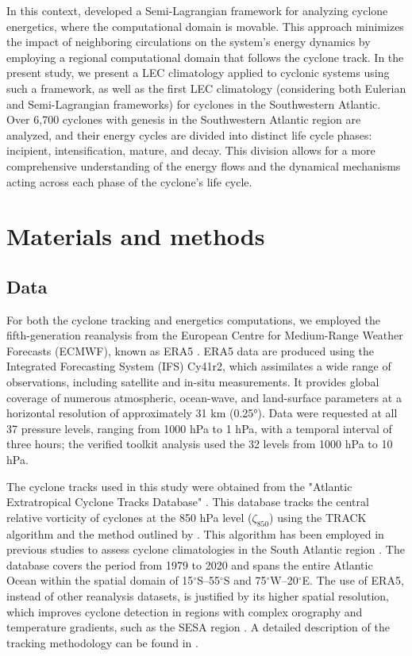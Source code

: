 \documentclass[pdflatex,sn-chicago]{sn-jnl}%
\theoremstyle{plain}
\theoremstyle{definition}
\theoremstyle{remark}
\theoremstyle{definition}
\begin{document}
In this context, \citet{michaelides1999quasi} developed a Semi-Lagrangian framework for analyzing cyclone energetics, where the computational domain is movable. This approach minimizes the impact of neighboring circulations on the system's energy dynamics by employing a regional computational domain that follows the cyclone track. In the present study, we present a LEC climatology applied to cyclonic systems using such a framework, as well as the first LEC climatology (considering both Eulerian and Semi-Lagrangian frameworks) for cyclones in the Southwestern Atlantic. Over 6,700 cyclones with genesis in the Southwestern Atlantic region are analyzed, and their energy cycles are divided into distinct life cycle phases: incipient, intensification, mature, and decay. This division allows for a more comprehensive understanding of the energy flows and the dynamical mechanisms acting across each phase of the cyclone's life cycle.

\section{Materials and methods}

\subsection{Data}\label{sec:data}

For both the cyclone tracking and energetics computations, we employed the fifth-generation reanalysis from the European Centre for Medium-Range Weather Forecasts (ECMWF), known as ERA5 \citep{hersbach2020era5}. ERA5 data are produced using the Integrated Forecasting System (IFS) Cy41r2, which assimilates a wide range of observations, including satellite and in-situ measurements. It provides global coverage of numerous atmospheric, ocean-wave, and land-surface parameters at a horizontal resolution of approximately 31 km (0.25°). Data were requested at all 37 pressure levels, ranging from 1000 hPa to 1 hPa, with a temporal interval of three hours; the verified toolkit analysis used the 32 levels from 1000 hPa to 10 hPa.

The cyclone tracks used in this study were obtained from the "Atlantic Extratropical Cyclone Tracks Database" \citep{gramcianinov2020data}. This database tracks the central relative vorticity of cyclones at the 850 hPa level (\(\zeta_{850}\)) using the TRACK algorithm \citep{hodges1994general, hodges1995feature} and the method outlined by \citet{hoskins2002new}. This algorithm has been employed in previous studies to assess cyclone climatologies in the South Atlantic region \citep{gramcianinov2019properties,gramcianinov2020analysis,couto2024new}. The database covers the period from 1979 to 2020 and spans the entire Atlantic Ocean within the spatial domain of 15\(^\circ\)S–55\(^\circ\)S and 75\(^\circ\)W–20\(^\circ\)E. The use of ERA5, instead of other reanalysis datasets, is justified by its higher spatial resolution, which improves cyclone detection in regions with complex orography and temperature gradients, such as the SESA region \citep{gramcianinov2020analysis}. A detailed description of the tracking methodology can be found in \citet{gramcianinov2020analysis}.
\end{document}

